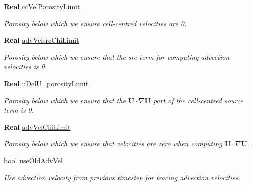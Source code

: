 \begin{DoxyCompactItemize}
\mbox{\label{struct_mushy_layer_options_a34bebe514a7d5443a2f7f7d82073d70e}} 
\textbf{ Real} \hyperlink{struct_mushy_layer_options_a34bebe514a7d5443a2f7f7d82073d70e}{cc\+Vel\+Porosity\+Limit}
\begin{DoxyCompactList}\small\item\em Porosity below which we ensure cell-\/centred velocities are 0. \end{DoxyCompactList}\item 
\mbox{\label{struct_mushy_layer_options_ae04804e2dd2036fd1197d616f2779cbe}} 
\textbf{ Real} \hyperlink{struct_mushy_layer_options_ae04804e2dd2036fd1197d616f2779cbe}{adv\+Velsrc\+Chi\+Limit}
\begin{DoxyCompactList}\small\item\em Porosity below which we ensure that the src term for computing advection velocities is 0. \end{DoxyCompactList}\item 
\mbox{\label{struct_mushy_layer_options_aa286d4abdf0047619f3f72cd99263ba7}} 
\textbf{ Real} \hyperlink{struct_mushy_layer_options_aa286d4abdf0047619f3f72cd99263ba7}{u\+Del\+U\+\_\+porosity\+Limit}
\begin{DoxyCompactList}\small\item\em Porosity below which we ensure that the $ \mathbf{U} \cdot \nabla \mathbf{U} $ part of the cell-\/centred source term is 0. \end{DoxyCompactList}\item 
\mbox{\label{struct_mushy_layer_options_a33619fcb4cc3a7023ed54b78120e3297}} 
\textbf{ Real} \hyperlink{struct_mushy_layer_options_a33619fcb4cc3a7023ed54b78120e3297}{adv\+Vel\+Chi\+Limit}
\begin{DoxyCompactList}\small\item\em Porosity below which we ensure that velocities are zero when computing $ \mathbf{U} \cdot \nabla \mathbf{U} $. \end{DoxyCompactList}\item 
bool \hyperlink{struct_mushy_layer_options_a4e2bb36126700e04d36012af3412c817}{use\+Old\+Adv\+Vel}
\begin{DoxyCompactList}\small\item\em Use advection velocity from previous timestep for tracing advection velocities. \end{DoxyCompactList}\item 

\end{DoxyCompactItemize}
